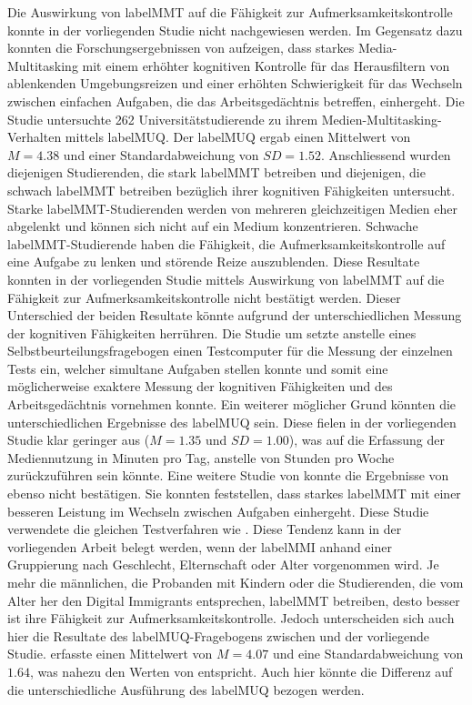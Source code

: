 Die Auswirkung von \gls{labelMMT} auf die Fähigkeit zur Aufmerksamkeitskontrolle konnte in der vorliegenden Studie nicht nachgewiesen werden. Im Gegensatz dazu konnten die Forschungsergebnissen von  aufzeigen, dass starkes Media-Multitasking mit einem erhöhter kognitiven Kontrolle für das Herausfiltern von ablenkenden Umgebungsreizen und einer erhöhten Schwierigkeit für das Wechseln zwischen einfachen Aufgaben, die das Arbeitsgedächtnis betreffen, einhergeht. Die Studie untersuchte 262 Universitätstudierende zu ihrem Medien-Multitasking-Verhalten mittels \gls{labelMUQ}. Der \gls{labelMUQ} ergab einen Mittelwert von $M=4.38$ und einer Standardabweichung von $SD=1.52$. Anschliessend wurden diejenigen Studierenden, die stark \gls{labelMMT} betreiben und diejenigen, die schwach \gls{labelMMT} betreiben bezüglich ihrer kognitiven Fähigkeiten untersucht. Starke \gls{labelMMT}-Studierenden werden von mehreren gleichzeitigen Medien eher abgelenkt und können sich nicht auf ein Medium konzentrieren. Schwache \gls{labelMMT}-Studierende haben die Fähigkeit, die Aufmerksamkeitskontrolle auf eine Aufgabe zu lenken und störende Reize auszublenden. Diese Resultate konnten in der vorliegenden Studie mittels Auswirkung von \gls{labelMMT} auf die Fähigkeit zur Aufmerksamkeitskontrolle nicht bestätigt werden. Dieser Unterschied der beiden Resultate könnte aufgrund der unterschiedlichen Messung der kognitiven Fähigkeiten herrühren. Die Studie um  setzte anstelle eines Selbstbeurteilungsfragebogen einen Testcomputer für die Messung der einzelnen Tests ein, welcher simultane Aufgaben stellen konnte und somit eine möglicherweise exaktere Messung der kognitiven Fähigkeiten und des Arbeitsgedächtnis vornehmen konnte. Ein weiterer möglicher Grund könnten die unterschiedlichen Ergebnisse des \gls{labelMUQ} sein. Diese fielen in der vorliegenden Studie klar geringer aus ($M=1.35$ und $SD=1.00$), was auf die Erfassung der Mediennutzung in Minuten pro Tag, anstelle von Stunden pro Woche zurückzuführen sein könnte. Eine weitere Studie von  konnte die Ergebnisse von  ebenso nicht bestätigen. Sie konnten feststellen, dass starkes \gls{labelMMT} mit einer besseren Leistung im Wechseln zwischen Aufgaben einhergeht. Diese Studie verwendete die gleichen Testverfahren wie . Diese Tendenz kann in der vorliegenden Arbeit belegt werden, wenn der \gls{labelMMI} anhand einer Gruppierung nach Geschlecht, Elternschaft oder Alter vorgenommen wird. Je mehr die männlichen, die Probanden mit Kindern oder die Studierenden, die vom Alter her den Digital Immigrants entsprechen, \gls{labelMMT} betreiben, desto besser ist ihre Fähigkeit zur Aufmerksamkeitskontrolle. Jedoch unterscheiden sich auch hier die Resultate des \gls{labelMUQ}-Fragebogens zwischen  und der vorliegende Studie. \citeauthor{Alzahabi2013} erfasste einen Mittelwert von $M=4.07$ und eine Standardabweichung von $1.64$, was nahezu den Werten von  entspricht. Auch hier könnte die Differenz auf die unterschiedliche Ausführung des \gls{labelMUQ} bezogen werden. 
